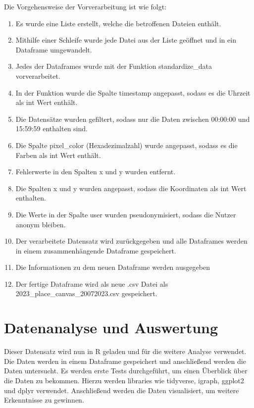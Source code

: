 \documentclass[
]{article}
\begin{document}
Die Vorgehensweise der Vorverarbeitung ist wie folgt:

\begin{enumerate}
\def\labelenumi{\arabic{enumi}.}
\item
  Es wurde eine Liste erstellt, welche die betroffenen Dateien enthält.
\item
  Mithilfe einer Schleife wurde jede Datei aus der Liste geöffnet und in
  ein Dataframe umgewandelt.
\item
  Jedes der Dataframes wurde mit der Funktion standardize\_data
  vorverarbeitet.
\item
  In der Funktion wurde die Spalte timestamp angepasst, sodass es die
  Uhrzeit als int Wert enthält.
\item
  Die Datensätze wurden gefiltert, sodass nur die Daten zwischen
  00:00:00 und 15:59:59 enthalten sind.
\item
  Die Spalte pixel\_color (Hexadezimalzahl) wurde angepasst, sodass es
  die Farben als int Wert enthält.
\item
  Fehlerwerte in den Spalten x und y wurden entfernt.
\item
  Die Spalten x und y wurden angepasst, sodass die Koordinaten als int
  Wert enthalten.
\item
  Die Werte in der Spalte user wurden pseudonymisiert, sodass die Nutzer
  anonym bleiben.
\item
  Der verarbeitete Datensatz wird zurückgegeben und alle Dataframes
  werden in einem zusammenhängende Dataframe gespeichert.
\item
  Die Informationen zu dem neuen Dataframe werden ausgegeben
\item
  Der fertige Dataframe wird als neue .csv Datei als
  2023\_place\_canvas\_20072023.csv gespeichert.
\end{enumerate}

\section{Datenanalyse und
Auswertung}\label{sec-datenanalyse-und-auswertung}

Dieser Datensatz wird nun in R geladen und für die weitere Analyse
verwendet. Die Daten werden in einem Dataframe gespeichert und
anschließend werden die Daten untersucht. Es werden erste Tests
durchgeführt, um einen Überblick über die Daten zu bekommen. Hierzu
werden libraries wie tidyverse, igraph, ggplot2 und dplyr verwendet.
Anschließend werden die Daten visualisiert, um weitere Erkenntnisse zu
gewinnen.
\end{document}
